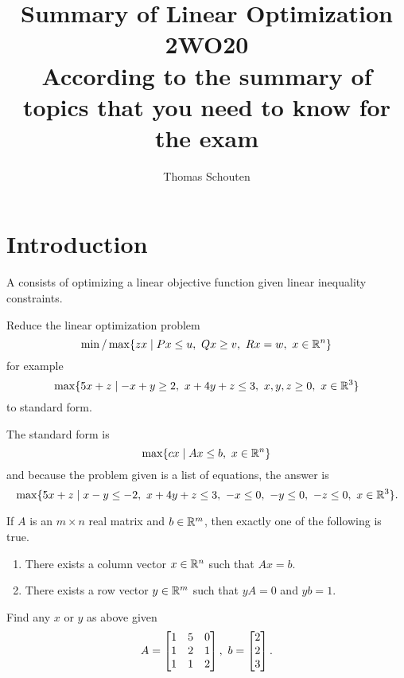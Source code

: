 \documentclass{exam}
\title{Summary of Linear Optimization 2WO20 \\ \small According to the summary of topics that you need to know for the exam}
\author{Thomas Schouten}
\begin{document}
    \maketitle

    \section{Introduction}\label{sec:introduction}

    \begin{define}
        A  consists of optimizing a linear objective function given linear inequality constraints.
    \end{define}
    
    \begin{question}
        Reduce the linear optimization problem
        \[
            \min/\max \{ zx \mid Px \le u,\ Qx \ge v,\ Rx =w,\ x \in \mathbb{R}^n \}
        \]
        for example
        \[
            \max \{ 5x + z \mid -x +y \ge 2,\ x + 4y + z \le 3,\ x,y,z \ge 0,\ x \in \mathbb{R}^3 \}
        \]
        to standard form.
    \end{question}
    \begin{answer}
        The standard form is
        \[
            \max \{ cx \mid Ax\le b,\ x \in \mathbb{R}^n \}
        \]
        and because the problem given is a list of equations, the answer is
        \[
            \max \{ 5x + z \mid x-y \le -2,\ x +4y+z \le 3,\ -x \le 0,\ -y\le 0,\ -z\le 0,\ x \in \mathbb{R}^3 \}.
        \]
    \end{answer}
    \begin{theorem}
        If $A$ is an $m\times n$ real matrix and $b \in \mathbb{R}^m$, then exactly one of the following is true.
        \begin{enumerate}
            \item There exists a column vector $x \in \mathbb{R}^n$ such that $Ax=b$.
            \item There exists a row vector $y \in \mathbb{R}^m$ such that $yA=0$ and $yb=1$.
        \end{enumerate}
    \end{theorem}
    \begin{question}
        Find any $x$ or $y$ as above given
        \[
            A = \matrix{1 & 5&0 \\ 1 & 2 & 1 \\ 1 & 1 & 2},\ b=\matrix{2 \\ 2 \\ 3}.
        \]
    \end{question}
\end{document}
